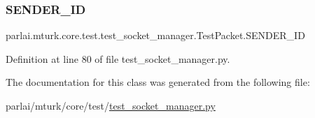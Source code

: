 \subsubsection{\texorpdfstring{S\+E\+N\+D\+E\+R\+\_\+\+ID}{SENDER\_ID}}
{\footnotesize\ttfamily parlai.\+mturk.\+core.\+test.\+test\+\_\+socket\+\_\+manager.\+Test\+Packet.\+S\+E\+N\+D\+E\+R\+\_\+\+ID\hspace{0.3cm}{\ttfamily [static]}}



Definition at line 80 of file test\+\_\+socket\+\_\+manager.\+py.



The documentation for this class was generated from the following file\+:\begin{DoxyCompactItemize}
\item 
parlai/mturk/core/test/\hyperlink{test_2test__socket__manager_8py}{test\+\_\+socket\+\_\+manager.\+py}\end{DoxyCompactItemize}

